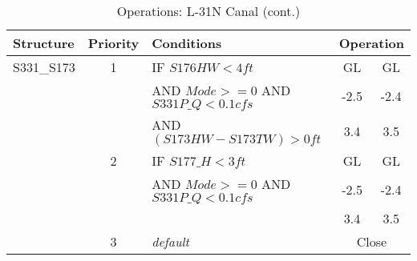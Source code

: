 \clearpage


\scriptsize
\begin{table}[!h]
\centering
\caption{Operations: L-31N Canal (cont.)}
\label{tab:M11opsL31Nb}
\begin{tabular}{|l|c|l|c|c|}
\hline
\textbf{Structure} & \textbf{Priority}  & \textbf{Conditions} & \multicolumn{2}{|c|}{\textbf{Operation}}   \\
\hline
\hline
S331\_S173    &  1  & IF  $S176HW < 4 ft$                        & GL    & GL   \\
              &     & AND $Mode >= 0$ AND $S331P\_Q < 0.1 cfs$   & -2.5  & -2.4 \\
              &     & AND $(S173HW-S173TW) > 0 ft$               & 3.4   & 3.5  \\
\hline
              &  2  & IF  $S177\_H < 3 ft$                       & GL    & GL   \\
              &     & AND $Mode >= 0$ AND $S331P\_Q < 0.1 cfs$   & -2.5  & -2.4 \\
              &     &                                            & 3.4   & 3.5  \\
\hline
              &  3  & \it{default}                  & \multicolumn{2}{|c|}{Close}           \\
\hline
\hline




\end{tabular}
\end{table}
